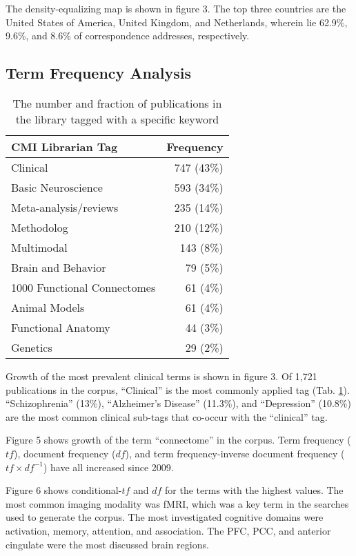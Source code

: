 \documentclass[12pt,3p]{elsarticle}
\begin{document}
The density-equalizing map is shown in figure 3. The top three countries are the
United States of America, United Kingdom, and Netherlands, wherein lie 62.9\%,
9.6\%, and 8.6\% of correspondence addresses, respectively.


\subsection{Term Frequency Analysis}

\begin{table}[H]
\caption{\label{tagfreqtable} The number and fraction of publications in the
library tagged with a specific keyword}
\begin{center}
\begin{tabular}{|l|r|}
\hline
{\bf CMI Librarian Tag}&{\bf Frequency} \\ \hline \hline
Clinical & 747 (43\%) \\ \hline
Basic Neuroscience&593 (34\%) \\ \hline
Meta-analysis/reviews&235 (14\%) \\ \hline
Methodolog&210 (12\%) \\ \hline
Multimodal&143 (8\%) \\ \hline
Brain and Behavior&79 (5\%) \\ \hline
1000 Functional Connectomes&61 (4\%) \\ \hline
Animal Models&61 (4\%) \\ \hline
Functional Anatomy&44 (3\%) \\ \hline
Genetics&29 (2\%) \\ \hline
\end{tabular}
\end{center}
\end{table}


Growth of the most prevalent clinical terms is shown in figure 3. Of 1,721
publications in the corpus, ``Clinical'' is the most commonly applied tag
(Tab. \ref{tagfreqtable}). ``Schizophrenia'' (13\%), ``Alzheimer's Disease'' (11.3\%),
and ``Depression'' (10.8\%) are the most common clinical sub-tags that co-occur with the
``clinical'' tag.

Figure 5 shows growth of the term ``connectome'' in the corpus. Term frequency
($t\!f$), document frequency ($d\!f$), and term frequency-inverse document frequency
($t\!f \times d\!f^{-1}$) have all increased since 2009.  

Figure 6 shows conditional-$t\!f$ and $d\!f$ for the terms with the highest values. The
most common imaging modality was fMRI, which was a key term in the searches used
to generate the corpus. The most investigated cognitive domains were activation,
memory, attention, and association. The PFC, PCC, and anterior cingulate were
the most discussed brain regions. 
\end{document}
